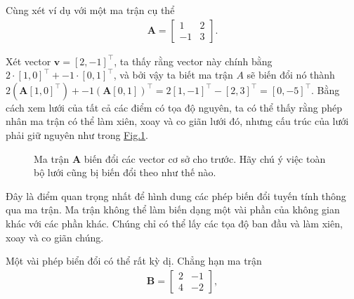 \documentclass[letterpaper,11pt,english]{sphinxmanual}
\begin{document}
Cùng xét ví dụ với một ma trận cụ thể
\begin{equation}\label{equation:chapter_appendix_math/geometry-linear-algebric-ops_vn:chapter_appendix_math/geometry-linear-algebric-ops_vn:10}
\begin{split}\mathbf{A} = \begin{bmatrix}
1 & 2 \\
-1 & 3
\end{bmatrix}.\end{split}
\end{equation}


Xét vector \(\mathbf{v} = [2, -1]^\top\), ta thấy rằng vector này
chính bằng \(2\cdot[1,0]^\top + -1\cdot[0,1]^\top\), và bởi vậy ta
biết ma trận \(A\) sẽ biến đổi nó thành
\(2(\mathbf{A}[1,0]^\top) + -1(\mathbf{A}[0,1])^\top = 2[1, -1]^\top - [2,3]^\top = [0, -5]^\top\).
Bằng cách xem lưới của tất cả các điểm có tọa độ nguyên, ta có thể thấy
rằng phép nhân ma trận có thể làm xiên, xoay và co giãn lưới đó, nhưng
cấu trúc của lưới phải giữ nguyên như trong
\hyperref[\detokenize{chapter_appendix_math/geometry-linear-algebric-ops_vn:fig-grid-transform}]{Fig.\@ \ref{\detokenize{chapter_appendix_math/geometry-linear-algebric-ops_vn:fig-grid-transform}}}.





\begin{figure}[H]
\centering
\capstart

\noindent{}
\caption{Ma trận \(\mathbf{A}\) biến đổi các vector cơ sở cho trước. Hãy
chú ý việc toàn bộ lưới cũng bị biến đổi theo như thế nào.}\label{\detokenize{chapter_appendix_math/geometry-linear-algebric-ops_vn:id10}}\label{\detokenize{chapter_appendix_math/geometry-linear-algebric-ops_vn:fig-grid-transform}}\end{figure}



Đây là điểm quan trọng nhất để hình dung các phép biến đổi tuyến tính
thông qua ma trận. Ma trận không thể làm biến dạng một vài phần của
không gian khác với các phần khác. Chúng chỉ có thể lấy các tọa độ ban
đầu và làm xiên, xoay và co giãn chúng.



Một vài phép biển đổi có thể rất kỳ dị. Chẳng hạn ma trận
\begin{equation}\label{equation:chapter_appendix_math/geometry-linear-algebric-ops_vn:chapter_appendix_math/geometry-linear-algebric-ops_vn:11}
\begin{split}\mathbf{B} = \begin{bmatrix}
2 & -1 \\ 4 & -2
\end{bmatrix},\end{split}
\end{equation}
\end{document}
